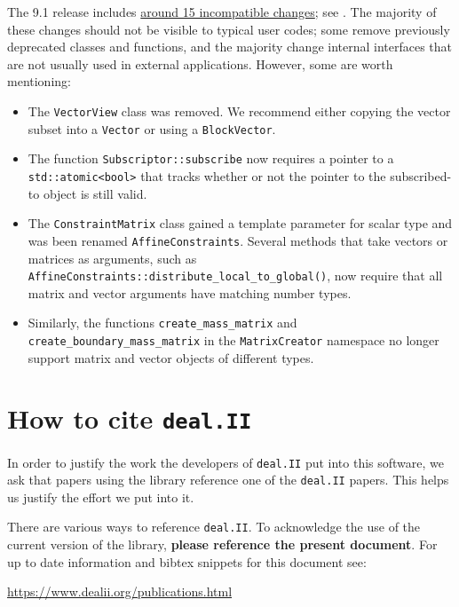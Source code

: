 \documentclass{ansarticle-preprint}
\newcommand{\specialword}[1]{\texttt{#1}}
\newcommand{\dealii}{{\specialword{deal.II}}\xspace}
\begin{document}
The 9.1 release includes
\href{https://dealii.org/developer/doxygen/deal.II/changes_between_9_0_1_and_9_1_0.html}
     {around 15 incompatible changes}; see \cite{changes91}. The majority of these changes
should not be visible to typical user codes; some remove previously
deprecated classes and functions, and the majority change internal
interfaces that are not usually used in external
applications. However, some are worth mentioning:
\begin{itemize}
\item The \texttt{VectorView} class was removed. We recommend either copying the
      vector subset into a \texttt{Vector} or using a \texttt{BlockVector}.
\item The function \texttt{Subscriptor::subscribe} now requires a pointer to a
      \texttt{std::atomic<bool>} that tracks whether or not the pointer to the
      subscribed-to object is still valid.
\item The \texttt{ConstraintMatrix} class gained a template parameter for scalar
      type and was been renamed \texttt{AffineConstraints}. Several methods that
      take vectors or matrices as arguments,
      such as \texttt{AffineConstraints::distribute\_local\_to\_global()},
      now require that all matrix and vector arguments have matching number
      types.
\item Similarly, the functions \texttt{create\_mass\_matrix} and
      \texttt{create\_boundary\_mass\_matrix} in the \texttt{MatrixCreator}
      namespace no longer
      support matrix and vector objects of different types.
\end{itemize}



\section{How to cite \dealii}\label{sec:cite}

In order to justify the work the developers of \dealii put into this
software, we ask that papers using the library reference one of the
\dealii papers. This helps us justify the effort we put into it.

There are various ways to reference \dealii. To acknowledge the use of
the current version of the library, \textbf{please reference the present
document}. For up to date information and bibtex snippets for this document
see:
\begin{center}
 \url{https://www.dealii.org/publications.html}
\end{center}
\end{document}
